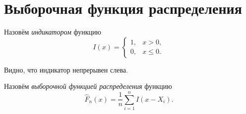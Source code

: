 \section{Выборочная функция распределения}
\begin{definition}
	Назовём \emph{индикатором} функцию
\[
	I(x) = \begin{cases}1, &x>0,\\
	0, &x\leqslant 0.\end{cases}
\]
\end{definition}
Видно, что индикатор непрерывен слева.

\begin{definition}
	Назовём \emph{выборочной функцией распределения} функцию
	\[
		\widehat F_n (x) = \frac{1}{n} \sum_{i=1}^n I(x-X_i).
	\]
\end{definition}


